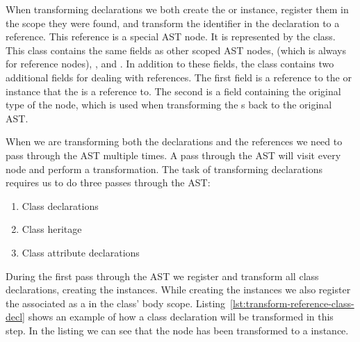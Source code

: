 When transforming declarations we both create the  or  instance, register them in the scope they were found, and transform the identifier in the declaration to a reference.
This reference is a special AST node.
It is represented by the  class.
This class contains the same fields as other scoped AST nodes,  (which is always  for reference nodes), ,  and .
In addition to these fields, the  class contains two additional fields for dealing with references.
The first field is a reference to the  or  instance that the  is a reference to.
The second is a field containing the original type of the node, which is used when transforming the s back to the original AST\@.

When we are transforming both the declarations and the references we need to pass through the AST multiple times.
A pass through the AST will visit every node and perform a transformation.
The task of transforming declarations requires us to do three passes through the AST:

\begin{enumerate}
    \item Class declarations
    \item Class heritage
    \item Class attribute declarations
\end{enumerate}

During the first pass through the AST we register and transform all class declarations, creating the  instances.
While creating the  instances we also register the associated  as a  in the class' body scope.
Listing~\vref{lst:transform-reference-class-decl} shows an example of how a class declaration will be transformed in this step.
In the listing we can see that the  node has been transformed to a  instance.

